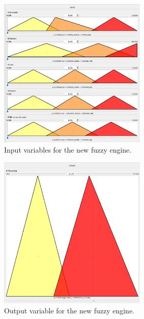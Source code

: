\begin{figure}[H]
  \centering
  \includegraphics[width=0.63\textwidth]{../images/new-vars-inputs.png}
  \caption{Input variables for the new fuzzy engine.}
  \label{fig:new-fuzzy-engine-inputs}
\end{figure}

\begin{figure}[H]
  \centering
  \includegraphics[width=0.63\textwidth]{../images/new-vars-output.png}
  \caption{Output variable for the new fuzzy engine.}
  \label{fig:new-fuzzy-engine-output}
\end{figure}
